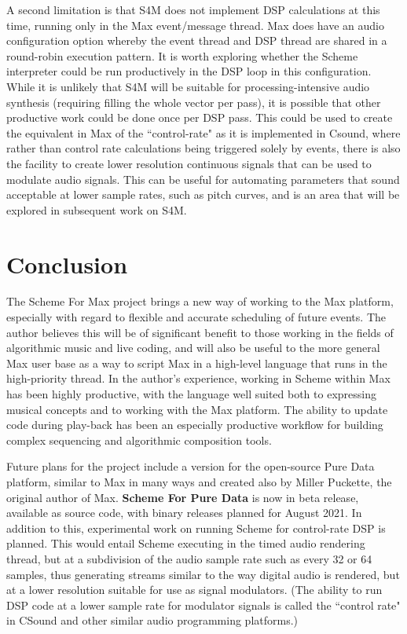 \documentclass[acmsmall]{acmart}
\begin{document}
A second limitation is that S4M does not implement DSP calculations at this
time, running only in the Max event/message thread. 
Max does have an audio configuration option
whereby the event thread and DSP thread are shared in a round-robin
execution pattern. It is worth exploring whether the Scheme interpreter
could be run productively in the DSP loop in this configuration. While it is
unlikely that S4M will be suitable for processing-intensive audio synthesis
(requiring filling the whole vector per pass), it is possible that
other productive work could be done once per DSP pass.
This could be used to create the equivalent in Max of the ``control-rate"
as it is implemented in Csound, where rather than control rate calculations being triggered
solely by events, there is also the facility to create lower resolution
continuous signals that can be used to modulate audio signals. 
This can be useful for automating parameters that 
sound acceptable at lower sample rates, such as pitch curves, and is
an area that will be explored in subsequent work on S4M.


\section{Conclusion}
The Scheme For Max project brings a new way of working 
to the Max platform, especially with regard to flexible and accurate 
scheduling of future events.  The author believes this will be
of significant benefit to those working in the fields of algorithmic
music and live coding, and will also be useful to the more general Max 
user base as a way to script Max in a high-level language that runs in
the high-priority thread. In the author's experience, 
working in Scheme within Max has been highly productive, with the
language well suited both to expressing musical concepts and to working
with the Max platform. The ability to update code during play-back
has been an especially productive workflow for building complex 
sequencing and algorithmic composition tools.

Future plans for the project include a version for the open-source
Pure Data platform, similar to Max in many ways and created also by Miller Puckette,
the original author of Max. \textbf{Scheme For Pure Data} is now in beta release, available
as source code, with binary releases planned for August 2021. In addition
to this, experimental work on running Scheme for control-rate DSP is planned.
This would entail Scheme executing in the timed audio rendering thread, but
at a subdivision of the audio sample rate such as every 32 or 64 samples, 
thus generating streams similar to the way digital audio is rendered, but
at a lower resolution suitable for use as signal modulators. (The ability
to run DSP code at a lower sample rate for modulator signals 
is called the ``control rate" in CSound and other similar audio programming platforms.)
\end{document}
